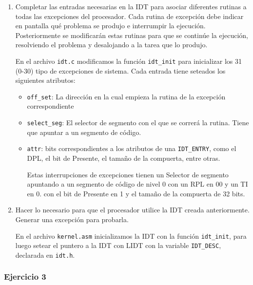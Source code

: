 \documentclass[a4paper]{article}
\begin{document}
\begin{enumerate}[label=\alph*)]
	\item Completar las entradas necesarias en la IDT para asociar diferentes rutinas a todas las excepciones del procesador. Cada rutina de excepción debe indicar en pantalla qué problema se produjo e interrumpir la ejecución. Posteriormente se modificarán estas rutinas para que se continúe la ejecución, resolviendo el problema y desalojando a la tarea que lo produjo.
	
	En el archivo \texttt{idt.c} modificamos la funci\'on \texttt{idt\_init} para inicializar los 31 (0-30) tipo de excepciones de sistema. Cada entrada tiene seteados los siguientes atributos:
	
	\begin{itemize}
		\item \texttt{off\_set}: La direcci\'on en la cual empieza la rutina de la excepci\'on correspondiente
		\item \texttt{select\_seg}: El selector de segmento con el que se correr\'a la rutina. Tiene que apuntar a un segmento de c\'odigo.
		\item \texttt{attr}: bits correspondientes a los atributos de una \texttt{IDT\_ENTRY}, como el DPL, el bit de Presente, el tama\~no de la compuerta, entre otras.
		
		Estas interrupciones de excepciones tienen un Selector de segmento apuntando a un segmento de c\'odigo de nivel 0 con un RPL en 00 y un TI en 0. con el bit de Presente en 1 y el tama\~no de la compuerta de 32 bits.
	\end{itemize}
	
	\item Hacer lo necesario para que el procesador utilice la IDT creada anteriormente. Generar una excepción para probarla.
	
	En el archivo \texttt{kernel.asm} inicializamos la IDT con la funci\'on \texttt{idt\_init}, para luego setear el puntero a la IDT con LIDT con la variable \texttt{IDT\_DESC}, declarada en \texttt{idt.h}.
	
\end{enumerate}

 \subsubsection{Ejercicio 3}
 
\end{document}
